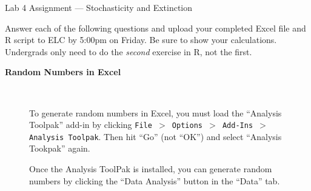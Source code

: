\documentclass[12pt]{article}\usepackage[]{graphicx}\usepackage[]{xcolor}
\begin{document}
{
  \Large
  \centering
  Lab 4 Assignment --- Stochasticity and Extinction \par
  \normalsize
  Answer each of the following questions and upload your completed Excel
  file and R script to ELC by 5:00pm on Friday. Be sure to show your
  calculations. Undergrads only need to do the \textit{second}
  exercise in R, not the first. \\
}

\vspace{12pt}

{\bf Random Numbers in Excel \\}

\begin{figure}[h]
  \centering
   \\
  \caption{To generate random numbers in Excel, you must load the
    ``Analysis Toolpak'' add-in by clicking
    {\tt File $>$ Options $>$ Add-Ins $>$ Analysis Toolpak}. Then hit
    ``Go'' (not ``OK'') and select ``Analysis Tookpak'' again.}
  \label{fig:rng}
\end{figure}

\clearpage

\begin{figure}[h]
  \centering
  \caption{\footnotesize Once the Analysis ToolPak is installed, you can generate
    random numbers by clicking the ``Data Analysis'' button in the
    ``Data'' tab.
  }
  \label{fig:rng-2}
\end{figure}
\end{document}
